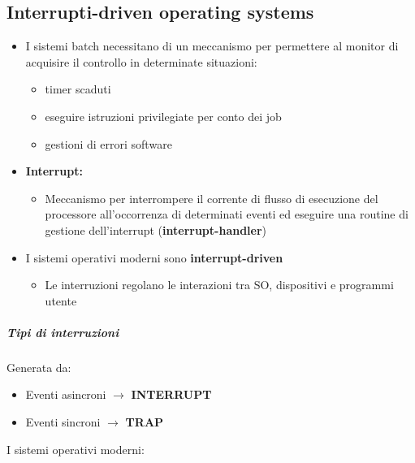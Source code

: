 \subsection{Interrupti-driven operating systems}
\begin{itemize}
\item I sistemi batch necessitano di un meccanismo per permettere al monitor di acquisire il controllo in determinate situazioni: 
 \begin{itemize}
 \item timer scaduti
 \item eseguire istruzioni privilegiate per conto dei job
 \item gestioni di errori software
\end{itemize}
\item \textbf{Interrupt:}
 \begin{itemize}
 \item Meccanismo per interrompere il corrente di flusso di esecuzione del processore all'occorrenza di determinati eventi ed eseguire una routine di gestione dell'interrupt (\textbf{interrupt-handler})
 \end{itemize}
\item I sistemi operativi moderni sono \textbf{interrupt-driven}
 \begin{itemize}
 \item Le interruzioni regolano le interazioni tra SO, dispositivi e programmi utente
 \end{itemize}
\end{itemize}
\subparagraph{Tipi di interruzioni}
Generata da: 
\begin{itemize}
\item Eventi asincroni $\rightarrow$ \textbf{INTERRUPT}
\item Eventi sincroni $\rightarrow$ \textbf{TRAP}
\end{itemize}
I sistemi operativi moderni: 
